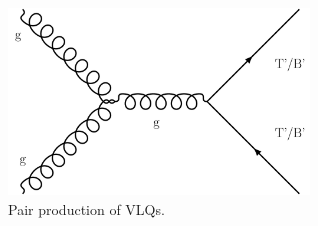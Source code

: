 \begin{figure} [htb]
    \centering
    \includegraphics[width=8cm]{Pair Production of VLQs (1).png}
    \caption{Pair production of VLQs. }
    \label{fig:VLQpairprod}
\end{figure}
